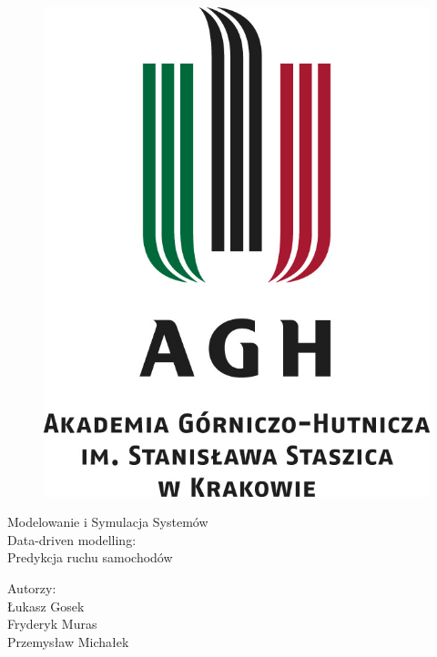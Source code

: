 \documentclass[a4paper,12pt]{article}
\begin{document}
\begin{figure}[!htb]
	\centerline{\includegraphics[scale=1]{agh_logo.jpg}}
\end{figure}

\begin{center}
	\Huge{Modelowanie i Symulacja Systemów\\
		Data-driven modelling:\\ Predykcja ruchu samochodów\\}
	\date{}

	\vspace{3cm}
	\Large{	Autorzy:\\
		Łukasz Gosek\\
		Fryderyk Muras\\
		Przemysław Michałek\\}

	\newpage

	
\end{center}
\end{document}
